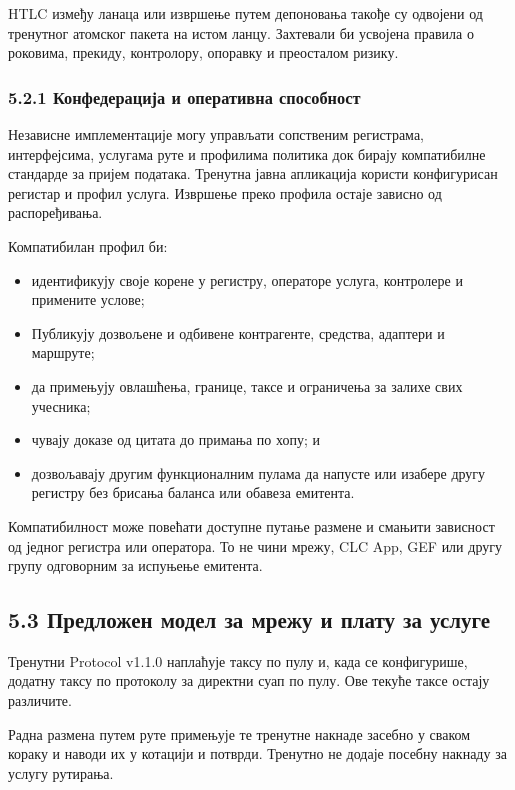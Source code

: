 \documentclass[11pt]{article}
\begin{document}
HTLC између ланаца или извршење путем депоновања такође су одвојени од тренутног атомског пакета на истом ланцу. Захтевали би усвојена правила о роковима, прекиду, контролору, опоравку и преосталом ризику.

\subsubsection*{5.2.1 Конфедерација и оперативна способност}

Независне имплементације могу управљати сопственим регистрама, интерфејсима, услугама руте и профилима политика док бирају компатибилне стандарде за пријем података. Тренутна јавна апликација користи конфигурисан регистар и профил услуга. Извршење преко профила остаје зависно од распоређивања.

Компатибилан профил би:

\begin{itemize}[leftmargin=*]
\item идентификују своје корене у регистру, операторе услуга, контролере и примените услове;
\item Публикују дозвољене и одбивене контрагенте, средства, адаптери и маршруте;
\item да примењују овлашћења, границе, таксе и ограничења за залихе свих учесника;
\item чувају доказе од цитата до примања по хопу; и
\item дозвољавају другим функционалним пулама да напусте или изабере другу регистру без брисања баланса или обавеза емитента.
\end{itemize}
Компатибилност може повећати доступне путање размене и смањити зависност од једног регистра или оператора. То не чини мрежу, CLC App, GEF или другу групу одговорним за испуњење емитента.

\subsection*{5.3 Предложен модел за мрежу и плату за услуге}

Тренутни Protocol v1.1.0 наплаћује таксу по пулу и, када се конфигурише, додатну таксу по протоколу за директни суап по пулу. Ове текуће таксе остају различите.

Радна размена путем руте примењује те тренутне накнаде засебно у сваком кораку и наводи их у котацији и потврди. Тренутно не додаје посебну накнаду за услугу рутирања.
\end{document}
